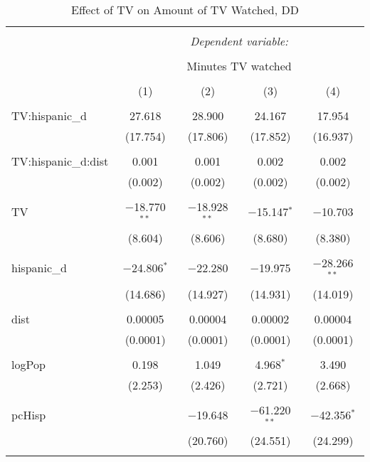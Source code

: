 
\begin{table}[!htbp] \centering 
  \caption{Effect of TV on Amount of TV Watched, DD} 
  \label{} 
\begin{tabular}{@{\extracolsep{-5pt}}lcccc} 
\\[-1.8ex]\hline 
\hline \\[-1.8ex] 
 & \multicolumn{4}{c}{\textit{Dependent variable:}} \\ 
\cline{2-5} 
\\[-1.8ex] & \multicolumn{4}{c}{Minutes TV watched} \\ 
\\[-1.8ex] & (1) & (2) & (3) & (4)\\ 
\hline \\[-1.8ex] 
 TV:hispanic\_d & 27.618 & 28.900 & 24.167 & 17.954 \\ 
  & (17.754) & (17.806) & (17.852) & (16.937) \\ 
  & & & & \\ 
 TV:hispanic\_d:dist & 0.001 & 0.001 & 0.002 & 0.002 \\ 
  & (0.002) & (0.002) & (0.002) & (0.002) \\ 
  & & & & \\ 
 TV & $-$18.770$^{**}$ & $-$18.928$^{**}$ & $-$15.147$^{*}$ & $-$10.703 \\ 
  & (8.604) & (8.606) & (8.680) & (8.380) \\ 
  & & & & \\ 
 hispanic\_d & $-$24.806$^{*}$ & $-$22.280 & $-$19.975 & $-$28.266$^{**}$ \\ 
  & (14.686) & (14.927) & (14.931) & (14.019) \\ 
  & & & & \\ 
 dist & 0.00005 & 0.00004 & 0.00002 & 0.00004 \\ 
  & (0.0001) & (0.0001) & (0.0001) & (0.0001) \\ 
  & & & & \\ 
 logPop & 0.198 & 1.049 & 4.968$^{*}$ & 3.490 \\ 
  & (2.253) & (2.426) & (2.721) & (2.668) \\ 
  & & & & \\ 
 pcHisp &  & $-$19.648 & $-$61.220$^{**}$ & $-$42.356$^{*}$ \\ 
  &  & (20.760) & (24.551) & (24.299) \\ 
  & & & & \\ 

\end{tabular}
\end{table}
